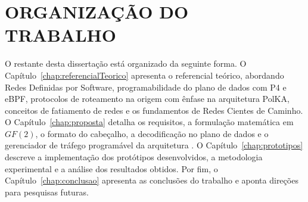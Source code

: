 \section{ORGANIZAÇÃO DO TRABALHO}

O restante desta dissertação está organizado da seguinte forma. O Capítulo~\ref{chap:referencialTeorico} apresenta o referencial teórico, abordando Redes Definidas por Software, programabilidade do plano de dados com P4 e eBPF, protocolos de roteamento na origem com ênfase na arquitetura PolKA, conceitos de fatiamento de redes e os fundamentos de Redes Cientes de Caminho. O Capítulo~\ref{chap:proposta} detalha os requisitos, a formulação matemática em $GF(2)$, o formato do cabeçalho, a decodificação no plano de dados e o gerenciador de tráfego programável da arquitetura \nome. O Capítulo~\ref{chap:prototipos} descreve a implementação dos protótipos desenvolvidos, a metodologia experimental e a análise dos resultados obtidos. Por fim, o Capítulo~\ref{chap:conclusao} apresenta as conclusões do trabalho e aponta direções para pesquisas futuras.